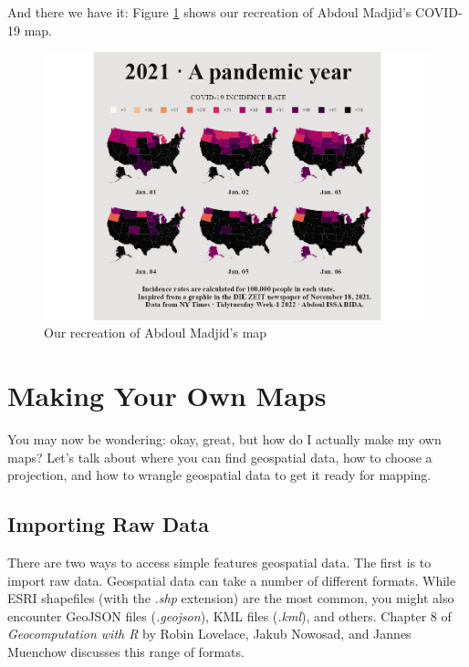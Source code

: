 \documentclass[
]{book}
\begin{document}
And there we have it: Figure \ref{fig:final-map-map} shows our recreation of Abdoul Madjid's COVID-19 map.

\begin{figure}
\includegraphics[width=1\linewidth]{maps_files/figure-latex/final-map-map-1} \caption{Our recreation of Abdoul Madjid's map}\label{fig:final-map-map}
\end{figure}

\hypertarget{making-your-own-maps}{%
\section*{Making Your Own Maps}\label{making-your-own-maps}}

You may now be wondering: okay, great, but how do I actually make my own maps? Let's talk about where you can find geospatial data, how to choose a projection, and how to wrangle geospatial data to get it ready for mapping.

\hypertarget{importing-raw-data}{%
\subsection*{Importing Raw Data}\label{importing-raw-data}}

There are two ways to access simple features geospatial data. The first is to import raw data. Geospatial data can take a number of different formats. While ESRI shapefiles (with the \emph{.shp} extension) are the most common, you might also encounter GeoJSON files (\emph{.geojson}), KML files (\emph{.kml}), and others. Chapter 8 of \emph{Geocomputation with R} by Robin Lovelace, Jakub Nowosad, and Jannes Muenchow discusses this range of formats.
\end{document}
